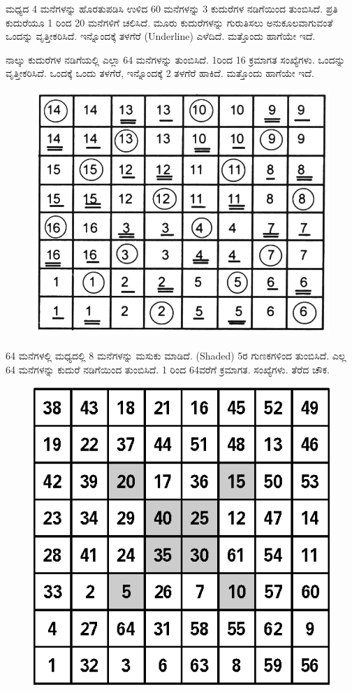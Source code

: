 ಮಧ್ಯದ 4 ಮನೆಗಳನ್ನು ಹೊರತುಪಡಿಸಿ ಉಳಿದ 60 ಮನೆಗಳನ್ನು 3 ಕುದುರೆಗಳ ನಡಿಗೆಯಿಂದ ತುಂಬಿಸಿದೆ. ಪ್ರತಿ ಕುದುರೆಯೂ 1 ರಿಂದ 20 ಮನೆಗಳಿಗೆ ಚಲಿಸಿದೆ. ಮೂರು ಕುದುರೆ\-ಗಳನ್ನು ಗುರುತಿಸಲು ಅನುಕೂಲವಾಗುವಂತೆ ಒಂದನ್ನು ವೃತ್ತೀಕರಿಸಿದೆ. ಇನ್ನೊಂದಕ್ಕೆ ತಳಗೆರೆ (Underline) ಎಳೆದಿದೆ. ಮತ್ತೊಂದು ಹಾಗೆಯೇ ಇದೆ.

ನಾಲ್ಕು ಕುದುರೆಗಳ ನಡಿಗೆಯಲ್ಲಿ ಎಲ್ಲಾ 64 ಮನೆಗಳನ್ನು ತುಂಬಿಸಿದೆ. 1ರಿಂದ 16 ಕ್ರಮಾಗತ ಸಂಖ್ಯೆಗಳು. ಒಂದನ್ನು ವೃತ್ತೀಕರಿಸಿದೆ. ಒಂದಕ್ಕೆ ಒಂದು ತಳಗೆರೆ, ಇನ್ನೊಂದಕ್ಕೆ 2 ತಳಗೆರೆ ಹಾಕಿದೆ. ಮತ್ತೊಂದು ಹಾಗೆಯೇ ಇದೆ.
\begin{figure}[H]
\includegraphics[scale=.88]{src/figures/chap6/fig6-19.jpg}
\end{figure}

64 ಮನೆಗಳಲ್ಲಿ ಮಧ್ಯದಲ್ಲಿ 8 ಮನೆಗಳನ್ನು ಮಸುಕು ಮಾಡಿದೆ. (Shaded) 5ರ ಗುಣಕ\-ಗಳಿಂದ ತುಂಬಿಸಿದೆ. ಎಲ್ಲ 64 ಮನೆಗಳನ್ನು ಕುದುರೆ ನಡಿಗೆಯಿಂದ ತುಂಬಿಸಿದೆ. 1 ರಿಂದ 64ವರೆಗೆ ಕ್ರಮಾಗತ. ಸಂಖ್ಯೆಗಳು. ತೆರೆದ ಚೌಕ.
\begin{figure}[H]
\includegraphics[scale=.78]{src/figures/chap6/fig6-20.eps}
\end{figure}

